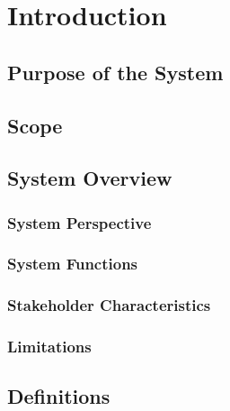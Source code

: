 \chapter{Introduction}

\section{Purpose of the System}

\section{Scope}

\section{System Overview}

\subsection{System Perspective}

\subsection{System Functions}

\subsection{Stakeholder Characteristics}

\subsection{Limitations}

\section{Definitions}